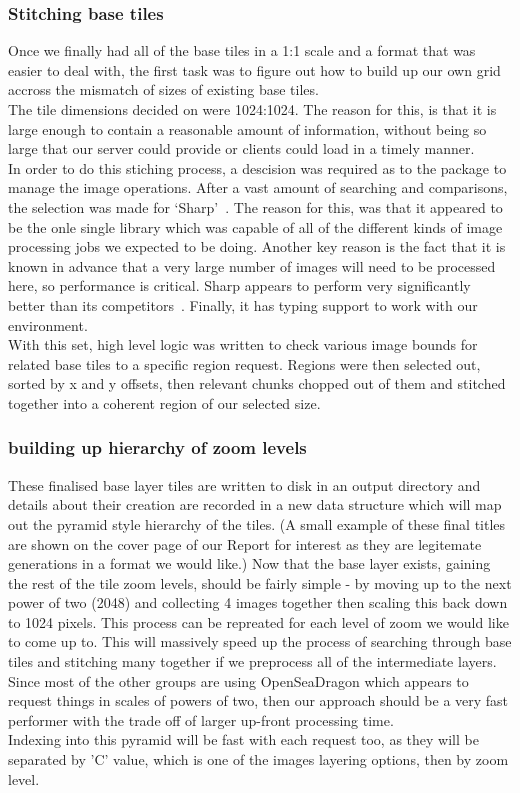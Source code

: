 \subsubsection{Stitching base tiles}
Once we finally had all of the base tiles in a 1:1 scale and a format that was easier to deal with, the first task
was to figure out how to build up our own grid accross the mismatch of sizes of existing base tiles.\\
The tile dimensions decided on were 1024:1024. The reason for this, is that it is large enough to contain a
reasonable amount of information, without being so large that our server could provide or clients could load in
a timely manner.\\
In order to do this stiching process, a descision was required as to the package to manage the image operations.
After a vast amount of searching and comparisons, the selection was made for `Sharp'~\cite{sharp}. The reason for
this, was that it appeared to be the onle single library which was capable of all of the different kinds of image
processing jobs we expected to be doing. Another key reason is the fact that it is known in advance that a very
large number of images will need to be processed here, so performance is critical. Sharp appears to perform
very significantly better than its competitors~\cite{sharpPerformance}. Finally, it has typing
support to work with our environment.\\
With this set, high level logic was written to check various image bounds for related base tiles to a specific
region request. Regions were then selected out, sorted by x and y offsets, then relevant chunks chopped out of
them and stitched together into a coherent region of our selected size.\\

\subsubsection{building up hierarchy of zoom levels}
These finalised base layer tiles are written to disk in an output directory and details about their creation
are recorded in a new data structure which will map out the pyramid style hierarchy of the tiles.
(A small example of these final titles are shown on the cover page of our Report for interest as they are
legitemate generations in a format we would like.)
Now that the base layer exists, gaining the rest of the tile zoom levels, should be fairly simple - by moving
up to the next power of two (2048) and collecting 4 images together then scaling this back down to 1024 pixels.
This process can be repreated for each level of zoom we would like to come up to. This will massively speed up
the process of searching through base tiles and stitching many together if we preprocess all of the intermediate
layers. Since most of the other groups are using OpenSeaDragon which appears to request things in scales of powers
of two, then our approach should be a very fast performer with the trade off of larger up-front processing time.\\
Indexing into this pyramid will be fast with each request too, as they will be separated by 'C' value, which is
one of the images layering options, then by zoom level.

